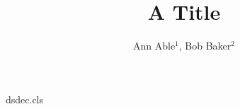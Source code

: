\begin{filecontents*}[overwrite]{dsdec.cls}
\def\affiliation#1{\gdef\@affil{\it #1}}
\def\@maketitle{\begin{center}{\LARGE\@title\par}\vskip1em{\large\@author\par}\end{center}
  {\small\@affil\par}\vskip1em}
\end{filecontents*}
\documentclass{dsdec}

\title{A Title}
\author{Ann Able$^{1}$, Bob Baker$^{2}$}
\maketitle
Text.

